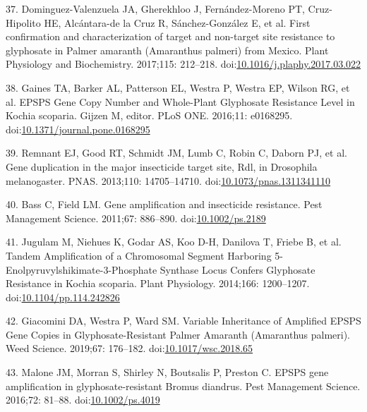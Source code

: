 \documentclass[10pt,letterpaper]{article}
\begin{document}
\leavevmode\hypertarget{ref-dominguez-valenzuela_first_2017}{}%
37. Dominguez-Valenzuela JA, Gherekhloo J, Fernández-Moreno PT,
Cruz-Hipolito HE, Alcántara-de la Cruz R, Sánchez-González E, et al.
First confirmation and characterization of target and non-target site
resistance to glyphosate in Palmer amaranth (Amaranthus palmeri) from
Mexico. Plant Physiology and Biochemistry. 2017;115: 212--218.
doi:\href{https://doi.org/10.1016/j.plaphy.2017.03.022}{10.1016/j.plaphy.2017.03.022}

\leavevmode\hypertarget{ref-gaines_epsps_2016}{}%
38. Gaines TA, Barker AL, Patterson EL, Westra P, Westra EP, Wilson RG,
et al. EPSPS Gene Copy Number and Whole-Plant Glyphosate Resistance
Level in Kochia scoparia. Gijzen M, editor. PLoS ONE. 2016;11: e0168295.
doi:\href{https://doi.org/10.1371/journal.pone.0168295}{10.1371/journal.pone.0168295}

\leavevmode\hypertarget{ref-remnant_gene_2013}{}%
39. Remnant EJ, Good RT, Schmidt JM, Lumb C, Robin C, Daborn PJ, et al.
Gene duplication in the major insecticide target site, Rdl, in
Drosophila melanogaster. PNAS. 2013;110: 14705--14710.
doi:\href{https://doi.org/10.1073/pnas.1311341110}{10.1073/pnas.1311341110}

\leavevmode\hypertarget{ref-bass_gene_2011}{}%
40. Bass C, Field LM. Gene amplification and insecticide resistance.
Pest Management Science. 2011;67: 886--890.
doi:\href{https://doi.org/10.1002/ps.2189}{10.1002/ps.2189}

\leavevmode\hypertarget{ref-jugulam_tandem_2014}{}%
41. Jugulam M, Niehues K, Godar AS, Koo D-H, Danilova T, Friebe B, et
al. Tandem Amplification of a Chromosomal Segment Harboring
5-Enolpyruvylshikimate-3-Phosphate Synthase Locus Confers Glyphosate
Resistance in Kochia scoparia. Plant Physiology. 2014;166: 1200--1207.
doi:\href{https://doi.org/10.1104/pp.114.242826}{10.1104/pp.114.242826}

\leavevmode\hypertarget{ref-giacomini_variable_2019}{}%
42. Giacomini DA, Westra P, Ward SM. Variable Inheritance of Amplified
EPSPS Gene Copies in Glyphosate-Resistant Palmer Amaranth (Amaranthus
palmeri). Weed Science. 2019;67: 176--182.
doi:\href{https://doi.org/10.1017/wsc.2018.65}{10.1017/wsc.2018.65}

\leavevmode\hypertarget{ref-malone_epsps_2016}{}%
43. Malone JM, Morran S, Shirley N, Boutsalis P, Preston C. EPSPS gene
amplification in glyphosate-resistant Bromus diandrus. Pest Management
Science. 2016;72: 81--88.
doi:\href{https://doi.org/10.1002/ps.4019}{10.1002/ps.4019}
\end{document}
